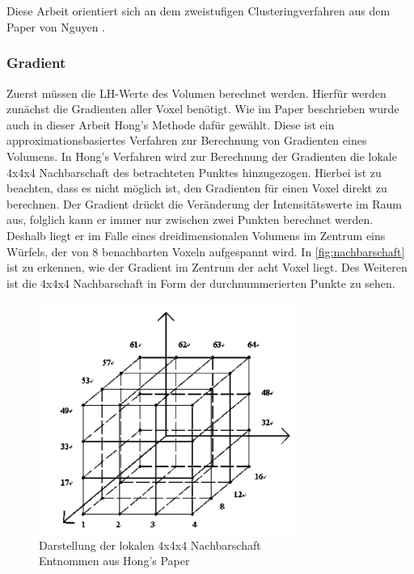 \chapter{}
\label{sec:methods}


Diese Arbeit orientiert sich an dem zweistufigen Clusteringverfahren aus dem Paper von Nguyen \cite{nguyen2012clustering}. 

\subsection{Gradient}

Zuerst müssen die LH-Werte des Volumen berechnet werden. Hierfür werden zunächst die Gradienten aller Voxel benötigt. Wie im Paper beschrieben wurde auch in dieser Arbeit Hong's Methode \cite{hong2003method} dafür gewählt.
Diese ist ein approximationsbasiertes Verfahren zur Berechnung von Gradienten eines Volumens. 
\newline
In Hong's Verfahren wird zur Berechnung der Gradienten die lokale 4x4x4 Nachbarschaft des betrachteten Punktes hinzugezogen. Hierbei ist zu beachten, dass es nicht möglich ist, den Gradienten für einen Voxel direkt zu berechnen. Der Gradient drückt die Veränderung der Intensitätswerte im Raum aus, folglich kann er immer nur zwischen zwei Punkten berechnet werden. Deshalb liegt er im Falle eines dreidimensionalen Volumens im Zentrum eins Würfels, der von 8 benachbarten Voxeln aufgespannt wird. In \autoref{fig:nachbarschaft} ist zu erkennen, wie der Gradient im Zentrum der acht Voxel liegt. Des Weiteren ist die 4x4x4 Nachbarschaft in Form der durchnummerierten Punkte zu sehen.
\newline

\begin{figure}[!h] 
\centering 
\includegraphics[width=0.75\textwidth]{Logos/VoxelEdges.PNG}
\caption{Darstellung der lokalen 4x4x4 Nachbarschaft  \\ Entnommen aus Hong's Paper} 
\label{fig:nachbarschaft} 
\end{figure}

